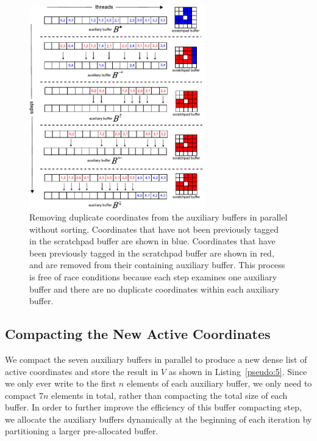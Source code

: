 \documentclass{egpubl}
\begin{document}
{{%
\begin{figure}[t]
\centering
\includegraphics[width=3.0in]{figures/RemoveDuplicates-Alt.pdf}
\caption{Removing duplicate coordinates from the auxiliary buffers in parallel without sorting. Coordinates that have not been previously tagged in the scratchpad buffer are shown in blue. Coordinates that have been previously tagged in the scratchpad buffer are shown in red, and are removed from their containing auxiliary buffer. This process is free of race conditions because each step examines one auxiliary buffer and there are no duplicate coordinates within each auxiliary buffer.}
\label{fig:4}
\end{figure}


\subsection{Compacting the New Active Coordinates}
\label{subsec:compactingTheNewActiveCoordinates} 

We compact the seven auxiliary buffers in parallel to produce a new dense list of active coordinates and store the result in $V$ as shown in Listing~\ref{pseudo:5}. Since we only ever write to the first $n$ elements of each auxiliary buffer, we only need to compact $7n$ elements in total, rather than compacting the total size of each buffer. In order to further improve the efficiency of this buffer compacting step, we allocate the auxiliary buffers dynamically at the beginning of each iteration by partitioning a larger pre-allocated buffer.

}}
\end{document}

